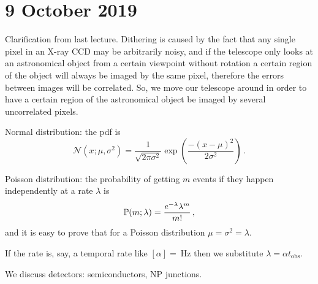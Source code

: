 \documentclass[main.tex]{subfiles}
\begin{document}
\section*{9 October 2019}

Clarification from last lecture.
Dithering is caused by the fact that any single pixel in an X-ray CCD may be arbitrarily noisy, and if the telescope only looks at an astronomical object from a certain viewpoint without rotation a certain region of the object will always be imaged by the same pixel, therefore the errors between images will be correlated.
So, we move our telescope around in order to have a certain region of the astronomical object be imaged by several uncorrelated pixels.

Normal distribution: the pdf is
%
\begin{equation}
  \mathcal N (x; \mu, \sigma^2) = \frac{1}{\sqrt{2 \pi \sigma^2}} \exp(\frac{-(x-\mu)^2}{2\sigma^2} ) \,.
\end{equation}

Poisson distribution: the probability of getting \(m\) events if they happen independently at a rate \(\lambda\) is
%
\begin{equation}
\P (m ; \lambda) = \frac{e^{-\lambda} \lambda^m}{m!} \,,
\end{equation}
%
and it is easy to prove that for a Poisson distribution \(\mu = \sigma^2 = \lambda\).

If the rate is, say, a temporal rate like \([\alpha] = \SI{}{\hertz}\) then we substitute \(\lambda = \alpha t_{\text{obs}}\).

We discuss detectors: semiconductors, NP junctions.
\end{document}
